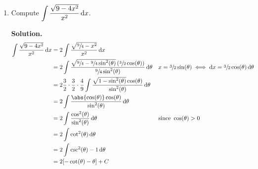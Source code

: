 \begin{Example}{}{}
    \begin{enumerate}[label=(\roman*)]
        \item Compute $ \displaystyle \int \frac{\sqrt{9-4x^2}}{x^2} \odif{x} $.

              \textbf{Solution.}
              \begin{align*}
                  \int \frac{\sqrt{9-4x^2}}{x^2} \odif{x}
                   & =2 \int \frac{\sqrt{\sfrac{9}{4}-x^2}}{x^2} \odif{x}                                                                                                                                                                              \\
                   & =2 \int \frac{\sqrt{\sfrac{9}{4}-\sfrac{9}{4}\sin^2(\theta)}\left( \sfrac{3}{2}\cos(\theta) \right)}{\sfrac{9}{4}\sin^2(\theta)} \odif{\theta} &  & x=\sfrac{3}{2}\sin(\theta)\iff \odif{x}=\sfrac{3}{2}\cos(\theta)\odif{\theta} \\
                   & =2 \frac{3}{2} \cdot \frac{3}{2} \cdot \frac{4}{9}
                  \int \frac{\sqrt{1-\sin^2(\theta)}\cos(\theta)}{\sin^2(\theta)} \odif{\theta}                                                                                                                                                        \\
                   & =2 \int \frac{\abs{\cos(\theta)}\cos(\theta)}{\sin^2(\theta)} \odif{\theta}                                                                                                                                                       \\
                   & =2 \int \frac{\cos^2(\theta)}{\sin^2(\theta)} \odif{\theta}                                                                                    &  & \text{since }\cos(\theta)>0                                                   \\
                   & =2 \int \cot^2(\theta)\odif{\theta}                                                                                                                                                                                               \\
                   & =2 \int \csc^2(\theta)-1\odif{\theta}                                                                                                                                                                                             \\
                   & =2[-\cot(\theta)-\theta]+C                                                                                                                                                                                                        \\

\end{align*}
\end{enumerate}
\end{Example}
